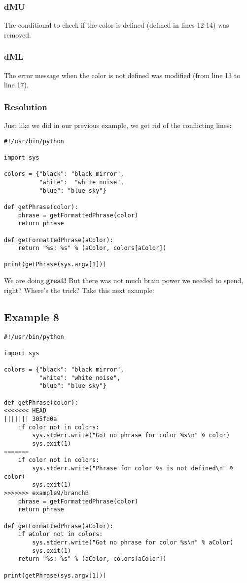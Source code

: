 \subsubsection{dMU}
The conditional to check if the color is defined (defined in lines 12-14) was removed.

\subsubsection{dML}
The error message when the color is not defined was modified (from line 13 to line 17).

\subsubsection{Resolution}
Just like we did in our previous example, we get rid of the conflicting lines:

\begin{lstlisting}[style=python_style,
	basicstyle=\small,
	caption={\bf example 7} - resolution]
#!/usr/bin/python

import sys

colors = {"black": "black mirror",
          "white":  "white noise",
          "blue": "blue sky"}

def getPhrase(color):
    phrase = getFormattedPhrase(color)
    return phrase

def getFormattedPhrase(aColor):
    return "%s: %s" % (aColor, colors[aColor])

print(getPhrase(sys.argv[1]))
\end{lstlisting}
We are doing {\bf great!} But there was not much brain power we needed to spend, right? Where's the trick? Take this next example:

\subsection{Example 8}
\label{example_08}

\begin{lstlisting}[style=python_style,
	basicstyle=\small,
	caption={\bf example 8}]
#!/usr/bin/python

import sys

colors = {"black": "black mirror",
          "white": "white noise",
          "blue": "blue sky"}

def getPhrase(color):
<<<<<<< HEAD
||||||| 305fd0a
    if color not in colors:
        sys.stderr.write("Got no phrase for color %s\n" % color)
        sys.exit(1)
=======
    if color not in colors:
        sys.stderr.write("Phrase for color %s is not defined\n" % color)
        sys.exit(1)
>>>>>>> example9/branchB
    phrase = getFormattedPhrase(color)
    return phrase

def getFormattedPhrase(aColor):
    if aColor not in colors:
        sys.stderr.write("Got no phrase for color %s\n" % aColor)
        sys.exit(1)
    return "%s: %s" % (aColor, colors[aColor])

print(getPhrase(sys.argv[1]))
\end{lstlisting}

